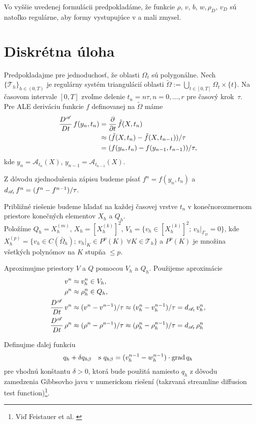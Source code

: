 Vo vyššie uvedenej formulácii predpokladáme, že funkcie $\rho,\,v,\,b,\,w,\rho_D,\,v_D$ sú
natoľko regulárne, aby formy vystupujúce v  a
 mali zmysel.

\section{Diskrétna úloha}

Predpokladajme pre jednoduchosť, že oblasti $\Omega_t$ sú polygonálne.
Nech $\{\mathcal T_h\}_{h \in (0,T)}$ je regulárny systém triangulácií oblasti 
$\widetilde\Omega:=\bigcup_{t\in[0,T]}\Omega_t\times\{t\}$. Na časovom intervale
$[0,T]$ zvoľme delenie $t_n=n\tau, n=0,\ldots,r$ pre časový krok~$\tau$. 
Pre ALE deriváciu funkcie $f$ definovanej na $\widetilde\Omega$ máme 
\[
\begin{split}
\frac{D^\mathcal A}{Dt}\, f(y_n,t_n) &= \frac{\partial}{\partial t}\,\tilde{f}(X,t_n) \\
&\approx(\tilde{f}(X,t_n)-\tilde{f}(X,t_{n-1}))/\tau \\
&= (f(y_n,t_n)-f(y_{n-1},t_{n-1}))/\tau, 
\end{split}
\]
kde $y_n=\mathcal A_{t_n}(X),\,y_{n-1}=\mathcal A_{t_{n-1}}(X)$.

Z dôvodu zjednodušenia zápisu budeme písať $f^n=f(y_n,t_n)$ a $d_{\mathcal A_t\,}
f^n=(f^n-f^{n-1})/\tau$.

Približné riešenie budeme hľadať na každej časovej vrstve $t_n$ v
konečnorozmernom priestore konečných elementov $X_h$ a $Q_h$. \\
Položíme $Q_h=X_h^{(m)}$, $X_h=[X_h^{(k)}]^2$, $V_h=\{v_h \in [X_h^{(k)}]^2;\,
v_h|_{\Gamma_D}=0\}$, kde $X_h^{(p)}=\{v_h\in C(\bar{\Omega}_h);\, v_h|_K \in
P^p(K) \;\forall K\in \mathcal T_h \}$ a $P^p(K)$ je množina všetkých polynómov
na $K$ stupňa $\leq p$. 


Aproximujme priestory $V$ a $Q$ pomocou $V_h$ a $Q_h$. Použijeme aproximácie 
\[
\begin{split}
v^n &\approx v_h^n \in V_h, \\
\rho^n &\approx \rho_h^n \in Q_h, \\
\frac{D^\mathcal A}{Dt}\, v^n &\approx (v^n-v^{n-1})/\tau \approx (v_h^n-v_h^{n-1})/\tau = d_{\mathcal A_t\,}
v_h^n, \\
\frac{D^\mathcal A}{Dt}\, \rho^n &\approx (\rho^n-\rho^{n-1})/\tau \approx
(\rho_h^n-\rho_h^{n-1})/\tau = d_{\mathcal A_t\,} \rho_h^n 
\end{split}
\]

Definujme ďalej funkciu
$$q_h+\delta q_{h\beta} \quad \mbox{s } q_{h\beta}=(v_h^{n-1}-w_h^{n-1})\cdot\mbox{grad}\,q_h$$ 
pre vhodnú konštantu $\delta>0$, ktorá bude použitá namiesto $q_h$ z dôvodu
zamedzenia Gibbsovho javu v numerickom riešení (takzvaná streamline diffusion
test function)\footnote{Viď Feistauer et al. \cite[s. 346]{feistauer}}. 

